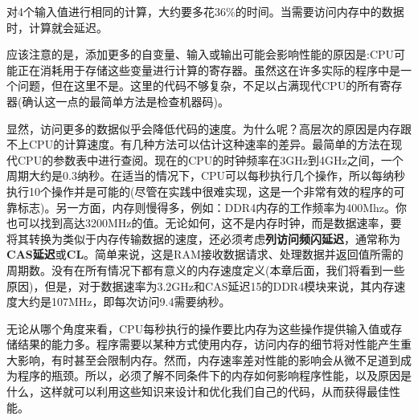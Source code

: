 对4个输入值进行相同的计算，大约要多花36\%的时间。当需要访问内存中的数据时，计算就会延迟。

应该注意的是，添加更多的自变量、输入或输出可能会影响性能的原因是:CPU可能正在消耗用于存储这些变量进行计算的寄存器。虽然这在许多实际的程序中是一个问题，但在这里不是。这里的代码不够复杂，不足以占满现代CPU的所有寄存器(确认这一点的最简单方法是检查机器码)。

显然，访问更多的数据似乎会降低代码的速度。为什么呢？高层次的原因是内存跟不上CPU的计算速度。有几种方法可以估计这种速率的差异。最简单的方法在现代CPU的参数表中进行查阅。现在的CPU的时钟频率在3GHz到4GHz之间，一个周期大约是0.3纳秒。在适当的情况下，CPU可以每秒执行几个操作，所以每纳秒执行10个操作并是可能的(尽管在实践中很难实现，这是一个非常有效的程序的可靠标志)。另一方面，内存则慢得多，例如：DDR4内存的工作频率为400Mhz。你也可以找到高达3200MHz的值。无论如何，这不是内存时钟，而是数据速率，要将其转换为类似于内存传输数据的速度，还必须考虑\textbf{列访问频闪延迟}，通常称为\textbf{CAS延迟}或\textbf{CL}。简单来说，这是RAM接收数据请求、处理数据并返回值所需的周期数。没有在所有情况下都有意义的内存速度定义(本章后面，我们将看到一些原因)，但是，对于数据速率为3.2GHz和CAS延迟15的DDR4模块来说，其内存速度大约是107MHz，即每次访问9.4需要纳秒。

无论从哪个角度来看，CPU每秒执行的操作要比内存为这些操作提供输入值或存储结果的能力多。程序需要以某种方式使用内存，访问内存的细节将对性能产生重大影响，有时甚至会限制内存。然而，内存速率差对性能的影响会从微不足道到成为程序的瓶颈。所以，必须了解不同条件下的内存如何影响程序性能，以及原因是什么，这样就可以利用这些知识来设计和优化我们自己的代码，从而获得最佳性能。









